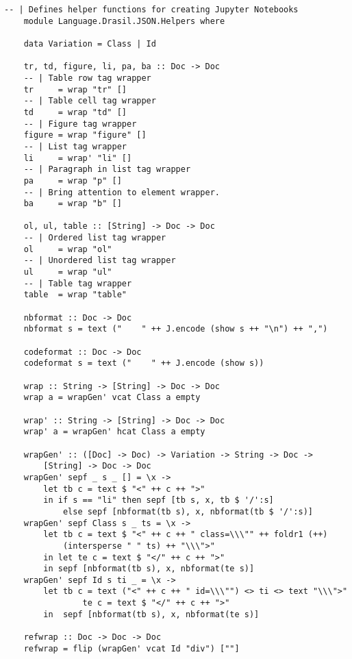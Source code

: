 \newpage

\begin{lstlisting}[language=haskell1, 
	basicstyle=\linespread{1.1}\small\ttfamily]
	-- | Defines helper functions for creating Jupyter Notebooks
	module Language.Drasil.JSON.Helpers where
	
	data Variation = Class | Id
	
	tr, td, figure, li, pa, ba :: Doc -> Doc
	-- | Table row tag wrapper
	tr     = wrap "tr" []
	-- | Table cell tag wrapper
	td     = wrap "td" []
	-- | Figure tag wrapper
	figure = wrap "figure" []
	-- | List tag wrapper
	li     = wrap' "li" []
	-- | Paragraph in list tag wrapper
	pa     = wrap "p" []
	-- | Bring attention to element wrapper.
	ba     = wrap "b" []
	
	ol, ul, table :: [String] -> Doc -> Doc
	-- | Ordered list tag wrapper
	ol     = wrap "ol"
	-- | Unordered list tag wrapper
	ul     = wrap "ul"
	-- | Table tag wrapper
	table  = wrap "table"
	
	nbformat :: Doc -> Doc
	nbformat s = text ("    " ++ J.encode (show s ++ "\n") ++ ",")
	
	codeformat :: Doc -> Doc
	codeformat s = text ("    " ++ J.encode (show s))
	
	wrap :: String -> [String] -> Doc -> Doc
	wrap a = wrapGen' vcat Class a empty
	
	wrap' :: String -> [String] -> Doc -> Doc
	wrap' a = wrapGen' hcat Class a empty
	
	wrapGen' :: ([Doc] -> Doc) -> Variation -> String -> Doc -> 
		[String] -> Doc -> Doc
	wrapGen' sepf _ s _ [] = \x -> 
		let tb c = text $ "<" ++ c ++ ">"
		in if s == "li" then sepf [tb s, x, tb $ '/':s] 
			else sepf [nbformat(tb s), x, nbformat(tb $ '/':s)]
	wrapGen' sepf Class s _ ts = \x ->
		let tb c = text $ "<" ++ c ++ " class=\\\"" ++ foldr1 (++) 
			(intersperse " " ts) ++ "\\\">"
		in let te c = text $ "</" ++ c ++ ">"
		in sepf [nbformat(tb s), x, nbformat(te s)]
	wrapGen' sepf Id s ti _ = \x ->
		let tb c = text ("<" ++ c ++ " id=\\\"") <> ti <> text "\\\">"
				te c = text $ "</" ++ c ++ ">"
		in  sepf [nbformat(tb s), x, nbformat(te s)] 
	
	refwrap :: Doc -> Doc -> Doc
	refwrap = flip (wrapGen' vcat Id "div") [""]
	

\end{lstlisting}
